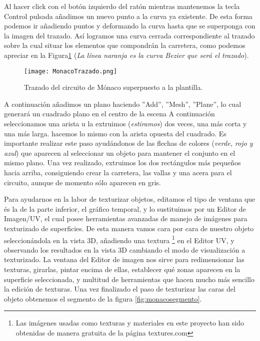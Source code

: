 Al hacer click con el botón izquierdo del ratón mientras mantenemos la tecla Control pulsada añadimos un nuevo punto a la curva ya existente. De esta forma podemos ir añadiendo puntos y deformando la curva hasta que se superponga con la imagen del trazado. Así logramos una curva cerrada correspondiente al trazado sobre la cual situar los elementos que compondrán la carretera, como podemos apreciar en la Figura\ref{fig:monacotrazado} (\textit{La línea naranja es la curva Bezier que será el trazado}).

\begin{figure}[ht]
	\centering
	\texttt{[image: MonacoTrazado.png]}
	\caption{Trazado del circuito de Mónaco superpuesto a la plantilla.} \label{fig:monacotrazado}
\end{figure}

A continuación añadimos un plano haciendo ”Add”, ”Mesh”, ”Plane”, lo cual generará un cuadrado plano en el centro de la escena A continuación seleccionamos una arista u la extruimos (\textit{estiramos}) dos veces, una más corta y una más larga. hacemos lo mismo con la arista opuesta del cuadrado. Es importante realizar este paso ayudándonos de las flechas de colores (\textit{verde, rojo y azul}) que aparecen al seleccionar un objeto para mantener el conjunto en el mismo plano. Una vez realizado, extruimos los dos rectángulos más pequeños hacia arriba, consiguiendo crear la carretera, las vallas y una acera para el circuito, aunque de momento sólo aparecen en gris.

Para ayudarnos en la labor de texturizar objetos, editamos el tipo de ventana que és la de la parte inferior, el gráfico temporal, y lo sustituimos por un Editor de Imagen/UV, el cual posee herramientas avanzadas de manejo de imágenes para texturizado de superficies. De esta manera vamos cara por cara de nuestro objeto seleccionándola en la vista 3D, añadiendo una textura \footnote{Las imágenes usadas como texturas y materiales en este proyecto han sido obtenidas de manera gratuita de la página textures.com\cite{texturescom}} en el Editor UV, y observando los resultados en la vista 3D cambiando el modo de visualización a texturizado. La ventana del Editor de imagen nos sirve para redimensionar las texturas, girarlas, pintar encima de ellas, establecer qué zonas aparecen en la superficie seleccionada, y multitud de herramientas que hacen mucho más sencillo la edición de texturas. Una vez finalizado el paso de texturizar las caras del objeto obtenemos el segmento de la figura \ref{fig:monacosegmento}.

